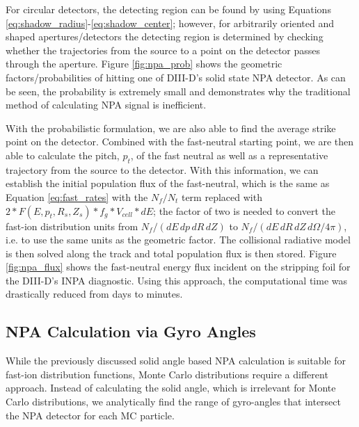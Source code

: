 For circular detectors, the detecting region can be found by using Equations \ref{eq:shadow_radius}-\ref{eq:shadow_center}; however, for arbitrarily oriented and shaped apertures/detectors the detecting region is determined by checking whether the trajectories from the source to a point on the detector passes through the aperture.
Figure \ref{fig:npa_prob} shows the geometric factors/probabilities of hitting one of DIII-D's solid state NPA detector. As can be seen, the probability is extremely small and demonstrates why the traditional method of calculating NPA signal is inefficient. 

With the probabilistic formulation, we are also able to find the average strike point on the detector. Combined with the fast-neutral starting point, we are then able to calculate the pitch, $p_t$, of the fast neutral as well as a representative trajectory from the source to the detector. With this information, we can establish the initial population flux of the fast-neutral, which is the same as Equation \ref{eq:fast_rates} with the $N_f/N_t$ term replaced with $2*F(E,p_t,R_s,Z_s)*f_g*V_{cell}*dE$; the factor of two is needed to convert the fast-ion distribution units from $N_f/(dE\,dp\,dR\,dZ)$ to $N_f/(dE\,dR\,dZ\,d\Omega/4\pi)$, i.e. to use the same units as the geometric factor. The collisional radiative model is then solved along the track and total population flux is then stored. Figure \ref{fig:npa_flux} shows the fast-neutral energy flux incident on the stripping foil for the DIII-D's INPA diagnostic. Using this approach, the computational time was drastically reduced from days to minutes.

\subsection{NPA Calculation via Gyro Angles}
While the previously discussed solid angle based NPA calculation is suitable for fast-ion distribution functions, Monte Carlo distributions require a different approach. Instead of calculating the solid angle, which is irrelevant for Monte Carlo distributions, we analytically find the range of gyro-angles that intersect the NPA detector for each MC particle. 

